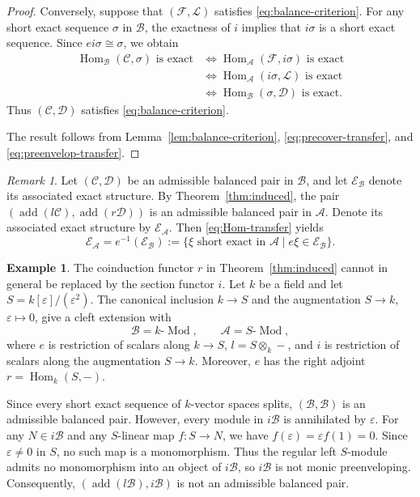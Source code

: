 \documentclass[11pt]{amsart}
\theoremstyle{definition}
\newtheorem{example}[theorem]{Example}
\theoremstyle{remark}
\newtheorem{remark}[theorem]{Remark}
\theoremstyle{plain}
\numberwithin{equation}{section}
\begin{document}
\begin{proof}
	Conversely, suppose that $(\mathcal{F},\mathcal{L})$ satisfies \eqref{eq:balance-criterion}. For any short exact sequence $\sigma$ in $\mathcal{B}$, the exactness of $i$ implies that $i\sigma$ is a short exact sequence. Since $ei\sigma\cong\sigma$, we obtain
	\[
	\begin{aligned}
		\operatorname{Hom}_{\mathcal{B}}(\mathcal{C},\sigma)
		\text{ is exact}
		&\Longleftrightarrow
		\operatorname{Hom}_{\mathcal{A}}(\mathcal{F},i\sigma)
		\text{ is exact}\\
		&\Longleftrightarrow
		\operatorname{Hom}_{\mathcal{A}}(i\sigma,\mathcal{L})
		\text{ is exact}\\
		&\Longleftrightarrow
		\operatorname{Hom}_{\mathcal{B}}(\sigma,\mathcal{D})
		\text{ is exact}.
	\end{aligned}
	\]
	Thus $(\mathcal{C},\mathcal{D})$ satisfies
	\eqref{eq:balance-criterion}.
	
	The result follows from Lemma~\ref{lem:balance-criterion},
	\eqref{eq:precover-transfer}, and
	\eqref{eq:preenvelop-transfer}.
\end{proof}

\begin{remark}\label{rem:exact-structure}
	Let $(\mathcal{C},\mathcal{D})$ be an admissible balanced pair in $\mathcal{B}$, and let $\mathcal{E}_{\mathcal{B}}$ denote
	its associated exact structure. By Theorem~\ref{thm:induced},
	the pair $(\operatorname{add}(l\mathcal{C}),
	\operatorname{add}(r\mathcal{D}))$
	is an admissible balanced pair in $\mathcal{A}$.
	Denote its associated exact structure by
	$\mathcal{E}_{\mathcal{A}}$.
	Then \eqref{eq:Hom-transfer} yields
	\[
	\mathcal{E}_{\mathcal{A}}
	=e^{-1}(\mathcal{E}_{\mathcal{B}})
	:=\{\xi\text{ short exact in }\mathcal{A}
	\mid e\xi\in\mathcal{E}_{\mathcal{B}}\}.
	\]
\end{remark}


\begin{example}\label{ex:section}
	The coinduction functor $r$ in Theorem~\ref{thm:induced} cannot in general be replaced by the section functor $i$. Let $k$ be a field and let
	$S=k[\varepsilon]/(\varepsilon^2)$.
	The canonical inclusion $k\to S$ and the augmentation
	$S\to k$, $\varepsilon\mapsto 0$, give a cleft extension with
	\[
	\mathcal{B}=k\text{-}\operatorname{Mod},
	\qquad
	\mathcal{A}=S\text{-}\operatorname{Mod},
	\]
	where $e$ is restriction of scalars along $k\to S$, $l=S\otimes_k-$, and $i$ is restriction of scalars along the augmentation $S\to k$. Moreover, $e$ has the right adjoint $r=\operatorname{Hom}_k(S,-)$.
	
	Since every short exact sequence of $k$-vector spaces splits, $(\mathcal{B},\mathcal{B})$ is an admissible balanced pair. However, every module in $i\mathcal{B}$ is annihilated by $\varepsilon$. For any $N\in i\mathcal{B}$ and any $S$-linear map $f:S\to N$, we have
	$f(\varepsilon)=\varepsilon f(1)=0$.
	Since $\varepsilon\neq 0$ in $S$, no such map is a monomorphism. Thus the regular left $S$-module admits no monomorphism into an object of $i\mathcal{B}$, so $i\mathcal{B}$ is not monic preenveloping. Consequently,
	$(\operatorname{add}(l\mathcal{B}),i\mathcal{B})$ is not an admissible balanced pair.
\end{example}
\end{document}
